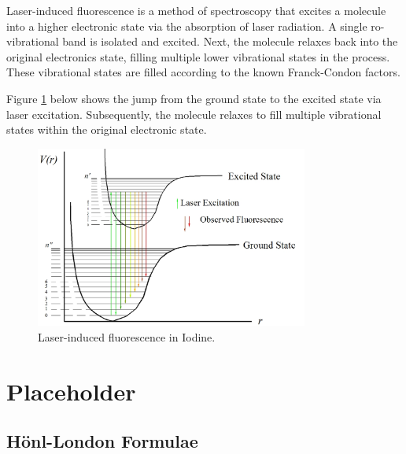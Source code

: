 \documentclass[11pt, twoside, fleqn]{report}
\begin{document}
Laser-induced fluorescence is a method of spectroscopy that excites a molecule into a higher electronic state via the absorption of laser radiation. A single ro-vibrational band is isolated and excited. Next, the molecule relaxes back into the original electronics state, filling multiple lower vibrational states in the process. These vibrational states are filled according to the known Franck-Condon factors.

Figure \ref{f:laser-induced_fluorescence_in_iodine} below shows the jump from the ground state to the excited state via laser excitation. Subsequently, the molecule relaxes to fill multiple vibrational states within the original electronic state.

\begin{figure}[H]
    \centering
    \includegraphics[width=0.8\textwidth]{img/lif_bands.jpg}
    \caption{Laser-induced fluorescence in Iodine.}
    \label{f:laser-induced_fluorescence_in_iodine}
\end{figure}

\chapter{Placeholder}

\section{H\"onl-London Formulae}
\end{document}
